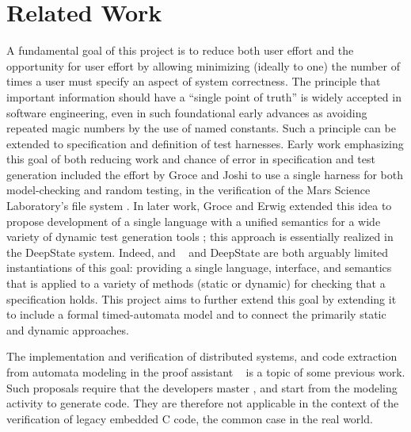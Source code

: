 \section{Related Work}

A fundamental goal of this project is to reduce both user effort and
the opportunity for user effort by allowing minimizing (ideally to
one) the number of times a user must specify an aspect of system
correctness.  The principle that important information should have a
``single point of truth'' is widely accepted in software engineering,
even in such foundational early advances as avoiding repeated magic
numbers by the use of named constants.  Such a principle can be
extended to specification and definition of test harnesses.  Early
work emphasizing this goal of both reducing work and chance of error
in specification and test generation included the effort by Groce and
Joshi to use a single harness for both model-checking and random
testing, in the verification of the Mars Science Laboratory's file
system \cite{WODA08,CFV08,AMAI}.  In later work, Groce and Erwig
extended this idea to propose development of a single language with a
unified semantics for a wide variety of dynamic test generation tools
\cite{WODACommon}; this approach is essentially realized in the
DeepState \cite{DeepState} system.  Indeed, \framac and
\acsl~\cite{ACSL} and DeepState are both arguably limited
instantiations of this goal: providing a single language, interface,
and semantics that is applied to a variety of methods (static or
dynamic) for checking that a specification holds.  This project aims
to further extend this goal by extending it to include a formal
timed-automata model and to connect the primarily static and dynamic approaches.

The implementation and verification of distributed systems,
and code extraction from automata modeling in the proof assistant
\Coq~\cite{WWP2015:PLDI,WWA2016:CPP,DBLP:conf/tacs/Paulin-Mohring01}
is a topic of some previous work.  Such  proposals require that the developers master \Coq, and start from the modeling activity to generate code.
They are therefore not applicable in the context of the verification
of legacy embedded C code, the common case in the real world.


